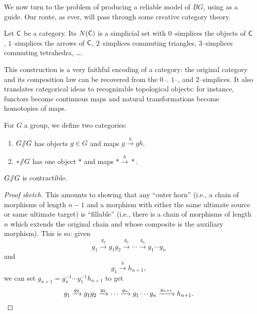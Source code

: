We now turn to the problem of producing a reliable model of $BG$, using  as a guide.
Our route, as ever, will pass through some creative category theory.

\begin{definition}
Let $\mathsf{C}$ be a category.
Its  $N(\mathsf{C})$ is a simplicial set with $0$--simplices the objects of $\mathsf{C}$, $1$--simplices the arrows of $\mathsf{C}$, $2$--simplices commuting triangles, $3$--simplices commuting tetrahedra, \ldots .
\end{definition}

\begin{remark}
This construction is a very faithful encoding of a category: the original category and its composition law can be recovered from the $0$--. $1$--, and $2$--simplices.
It also translates categorical ideas to recognizable topological objects: for instance, functors become continuous maps and natural transformations become homotopies of maps.
\end{remark}


\begin{example}
For $G$ a group, we define two categories:
\begin{enumerate}
    \item $G /\!\!/ G$ has objects $g \in G$ and maps $g \xrightarrow h gh$.
    \item $* /\!\!/ G$ has one object $*$ and maps $* \xrightarrow h *$.
\end{enumerate}
\end{example}

\begin{lemma}
$G /\!\!/ G$ is contractible.
\end{lemma}
\begin{proof}[Proof sketch]
This amounts to showing that any ``outer horn'' (i.e., a chain of morphisms of length $n-1$ and a morphism with either the same ultimate source or same ultimate target) is ``fillable'' (i.e., there is a chain of morphisms of length $n$ which extends the original chain and whose composite is the auxiliary morphism).
This is so: given \[g_1 \xrightarrow{g_2} g_1 g_2 \xrightarrow{g_3} \cdots \xrightarrow{g_n} g_1 \cdots g_n\] and \[g_1 \xrightarrow{h} h_{n+1},\] we can set $g_{n+1} = g_n^{-1} \cdots g_1^{-1} h_{n+1}$ to get \[g_1 \xrightarrow{g_2} g_1 g_2 \xrightarrow{g_3} \cdots \xrightarrow{g_n} g_1 \cdots g_n \xrightarrow{g_{n+1}} h_{n+1}. \qedhere\]
\end{proof}

